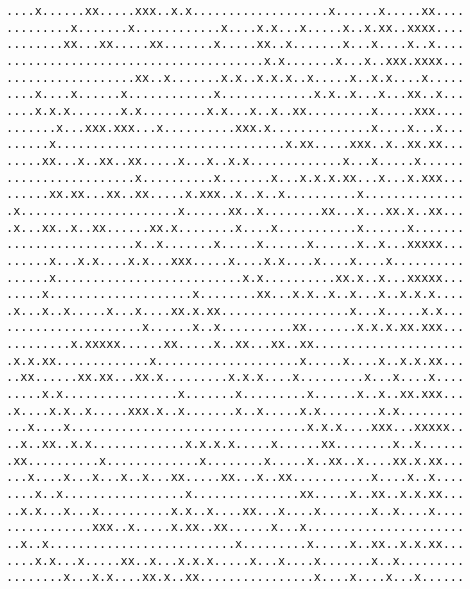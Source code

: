 {\begin{verbatim}
....x......xx.....xxx..x.x...................x......x.....xx....
.........x.......x............x....x.x...x.....x..x.xx..xxxx....
........xx...xx.....xx.......x.....xx..x.......x...x....x..x....
....................................x.x.......x...x..xxx.xxxx...
..................xx..x.......x.x..x.x.x..x.....x..x.x....x.....
....x....x......x............x.............x.x..x...x...xx..x...
....x.x.x.......x.x.........x.x...x..x..xx.........x.....xxx....
.......x...xxx.xxx...x..........xxx.x..............x....x...x...
......x................................x.xx.....xxx..x..xx.xx...
.....xx...x..xx..xx.....x...x..x.x.............x...x.....x......
..................x..........x.......x...x.x.x.xx...x...x.xxx...
......xx.xx...xx..xx.....x.xxx..x..x..x..........x..............
.x......................x......xx..x........xx...x...xx.x..xx...
.x...xx..x..xx......xx.x........x....x...........x......x.......
..................x..x.......x.....x......x......x..x...xxxxx...
......x...x.x....x.x...xxx.....x....x.x....x....x....x..........
......x..........................x.x..........xx.x..x...xxxxx...
.....x....................x........xx...x.x..x..x...x..x.x.x....
.x...x..x.....x...x....xx.x.xx..................x...x.....x.x...
...................x......x..x..........xx.......x.x.x.xx.xxx...
.........x.xxxxx......xx.....x..xx...xx..xx.....................
.x.x.xx.............x....................x.....x....x..x.x.xx...
..xx......xx.xx...xx.x.........x.x.x....x.........x...x....x....
.....x.x................x.......x.........x......x..x..xx.xxx...
.x....x.x..x.....xxx.x..x.......x..x.....x.x........x.x.........
...x....x.................................x.x.x....xxx...xxxxx..
..x..xx..x.x.............x.x.x.x.....x......xx........x..x......
.xx..........x.............x........x.....x..xx..x....xx.x.xx...
...x....x...x...x..x...xx.....xx...x..xx...........x....x..x....
....x..x.................x...............xx.....x..xx..x.x.xx...
..x.x...x...x..........x.x..x....xx...x....x.......x..x....x....
............xxx..x.....x.xx..xx......x...x......................
..x..x..........................x.........x.....x..xx..x.x.xx...
....x.x...x.....xx..x...x.x.x.....x...x....x.......x..x.........
........x...x.x....xx.x..xx................x....x....x...x......\end{verbatim}
}
